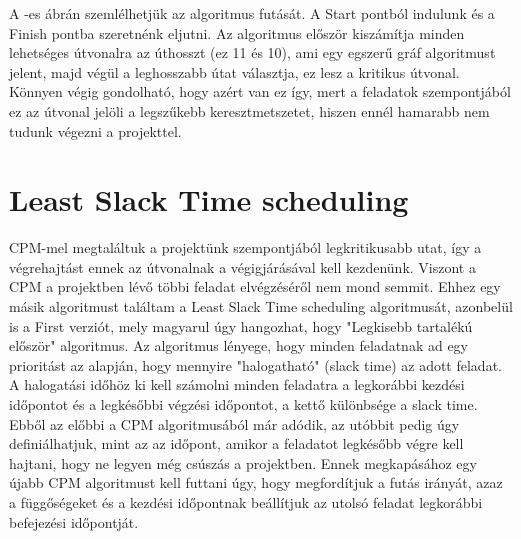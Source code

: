 A -es ábrán szemlélhetjük az algoritmus futását. A Start pontból indulunk és a Finish pontba szeretnénk eljutni. Az algoritmus először kiszámítja minden lehetséges útvonalra az úthosszt (ez 11 és 10), ami egy egszerű gráf algoritmust jelent, majd végül a leghosszabb útat választja, ez lesz a kritikus útvonal. Könnyen végig gondolható, hogy azért van ez így, mert a feladatok szempontjából ez az útvonal jelöli a legszűkebb keresztmetszetet, hiszen ennél hamarabb nem tudunk végezni a projekttel.

\section{Least Slack Time scheduling}
\hspace{2mm}  \indent CPM-mel megtaláltuk a projektünk szempontjából legkritikusabb utat, így a végrehajtást ennek az útvonalnak a végigjárásával kell kezdenünk. Viszont a CPM  a projektben lévő többi feladat elvégzéséről nem mond semmit. Ehhez egy másik algoritmust találtam a Least Slack Time scheduling algoritmusát, azonbelül is a First verziót, mely magyarul úgy hangozhat, hogy "Legkisebb tartalékú először" algoritmus. Az algoritmus lényege, hogy minden feladatnak ad egy prioritást az alapján, hogy mennyire "halogatható" (slack time) az adott feladat. A halogatási időhöz ki kell számolni minden feladatra a legkorábbi kezdési időpontot és a legkésőbbi végzési időpontot, a kettő különbsége a slack time. Ebből az előbbi a CPM algoritmusából már adódik, az utóbbit pedig úgy definiálhatjuk, mint az az időpont, amikor a feladatot legkésőbb végre kell hajtani, hogy ne legyen még csúszás a projektben. Ennek megkapásához egy újabb CPM algoritmust kell futtani úgy, hogy megfordítjuk a futás irányát, azaz a függőségeket és a kezdési időpontnak beállítjuk az utolsó feladat legkorábbi befejezési időpontját. 